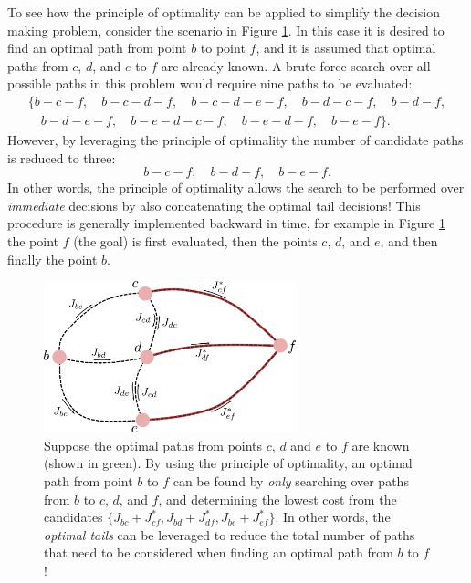 To see how the principle of optimality can be applied to simplify the decision making problem, consider the scenario in Figure \ref{fig:princopt2}. In this case it is desired to find an optimal path from point $b$ to point $f$, and it is assumed that optimal paths from $c$, $d$, and $e$ to $f$ are already known. A brute force search over all possible paths in this problem would require nine paths to be evaluated:
\begin{equation*}
\begin{split}
\{b-c-f, \quad b-c-d-f, \quad b-c-d-e-f, \quad b-d-c-f, \quad b-d-f, \\
\quad b-d-e-f, \quad b-e-d-c-f, \quad b-e-d-f, \quad b-e-f \}.
\end{split}
\end{equation*}
However, by leveraging the principle of optimality the number of candidate paths is reduced to three:
\begin{equation*}
b-c-f, \quad b-d-f, \quad b-e-f.
\end{equation*}
In other words, the principle of optimality allows the search to be performed over \textit{immediate} decisions by also concatenating the optimal tail decisions! This procedure is generally implemented backward in time, for example in Figure \ref{fig:princopt2} the point $f$ (the goal) is first evaluated, then the points $c$, $d$, and $e$, and then finally the point $b$.
\begin{figure}[ht]
    \centering
    \includegraphics[width=0.65\textwidth]{tex/figs/ch22_figs/princopt2.png}
    \caption{Suppose the optimal paths from points $c$, $d$ and $e$ to $f$ are known (shown in green). By using the principle of optimality, an optimal path from point $b$ to $f$ can be found by \textit{only} searching over paths from $b$ to $c$, $d$, and $f$, and determining the lowest cost from the candidates $\{J_{bc} + J^*_{cf}, J_{bd} + J^*_{df}, J_{be} + J^*_{ef}\}$. In other words, the \textit{optimal tails} can be leveraged to reduce the total number of paths that need to be considered when finding an optimal path from $b$ to $f$!}
    \label{fig:princopt2}
\end{figure}

